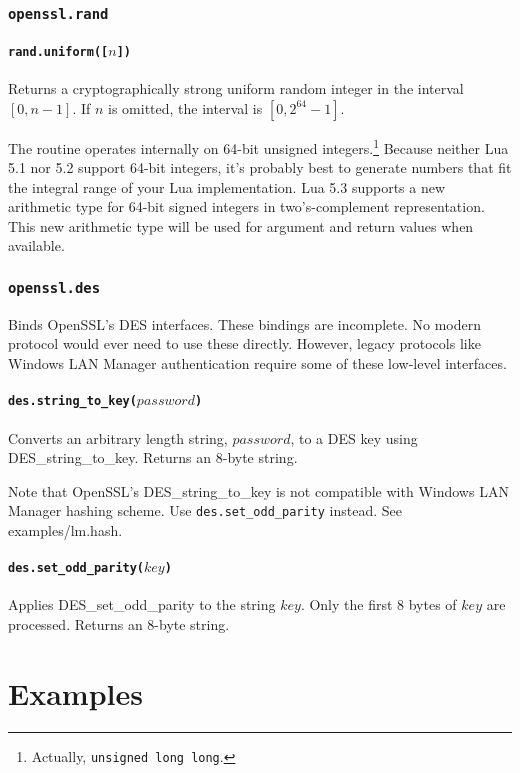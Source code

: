 \documentclass[11pt, oneside]{memoir}
\newcommand*{\fn}[1]{\texttt{#1}\xspace}
\newcounter{toccols}
\newenvironment{Module}[1]{
	\subsection{\texttt{#1}}
	\addtocontents{toc}{
		\protect\begin{multicols}{\value{toccols}}
	}
}{
	\addtocontents{toc}{\protect\end{multicols}}
}
\begin{document}
\begin{Module}{openssl.rand}
\subsubsection[\fn{rand.uniform}]{\fn{rand.uniform([$n$])}}

Returns a cryptographically strong uniform random integer in the interval $[0, n-1]$. If $n$ is omitted, the interval is $[0, 2^{64}-1]$.

The routine operates internally on 64-bit unsigned integers.\footnote{Actually, \texttt{unsigned long long}.} Because neither Lua 5.1 nor 5.2 support 64-bit integers, it's probably best to generate numbers that fit the integral range of your Lua implementation. Lua 5.3 supports a new arithmetic type for 64-bit signed integers in two's-complement representation. This new arithmetic type will be used for argument and return values when available.

\end{Module}


\begin{Module}{openssl.des}

Binds OpenSSL's DES interfaces. These bindings are incomplete. No modern protocol would ever need to use these directly. However, legacy protocols like Windows LAN Manager authentication require some of these low-level interfaces.

\subsubsection[\fn{des.string\_to\_key}]{\fn{des.string\_to\_key($password$)}}

Converts an arbitrary length string, $password$, to a DES key using DES\_string\_to\_key. Returns an 8-byte string.

Note that OpenSSL's DES\_string\_to\_key is not compatible with Windows LAN Manager hashing scheme. Use \fn{des.set\_odd\_parity} instead. See examples/lm.hash.

\subsubsection[\fn{des.set\_odd\_parity}]{\fn{des.set\_odd\_parity($key$)}}

Applies DES\_set\_odd\_parity to the string $key$. Only the first 8 bytes of $key$ are processed. Returns an 8-byte string.

\end{Module}


\chapter{Examples}
\end{document}

